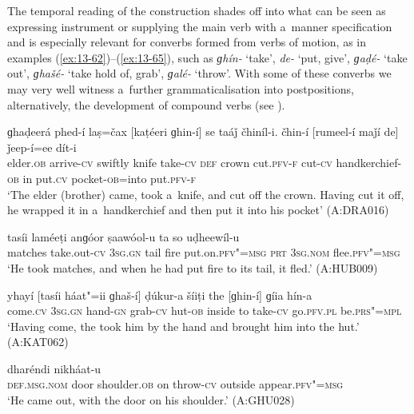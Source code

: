  The temporal  reading of the  construction shades off into what can be seen as expressing instrument or supplying the main verb with a~manner specification and is especially relevant for converbs formed from  verbs of motion, as in examples (\ref{ex:13-62})--(\ref{ex:13-65}), such as \textit{ɡhín-} `take', \textit{de-} `put, give', \textit{ɡaḍé-} `take out', \textit{ɡhašé-} `take hold of, grab', \textit{ɡalé-} `throw'. With some of these converbs we may very well witness a~further grammaticalisation into postpositions, alternatively, the development of compound verbs (see ). 

\begin{exe}
\ex
\label{ex:13-62}
\gll ɡhaḍeerá phed-í laṣ=čax [kaṭéeri ɡhin-í] se taáǰ čhiníl-i. čhin-í [rumeel-í maǰí de] ǰeep-í=ee dít-i \\
elder.\textsc{ob} arrive-\textsc{cv} swiftly knife take-\textsc{cv} \textsc{def} crown cut.\textsc{pfv-f} cut-\textsc{cv} handkerchief-\textsc{ob} in put.\textsc{cv} pocket-\textsc{ob}=into put.\textsc{pfv-f} \\
\glt `The elder (brother) came, took a~knife, and cut off the crown. Having cut it off, he wrapped it in a~handkerchief and then put it into his pocket' (A:DRA016)

\ex
\label{ex:13-63}
 tasíi laméeṭi anɡóor ṣaawóol-u ta so uḍheewíl-u \\
matches take.out-\textsc{cv} \textsc{3sg.gn} tail fire put.on.\textsc{pfv"=msg}  \textsc{prt } \textsc{3sg.nom} flee.\textsc{pfv"=msg} \\
\glt `He took matches, and when he had put fire to its tail, it fled.' (A:HUB009)

\ex
\label{ex:13-64}
\gll yhayí [tasíi háat"=ii ɡhaš-í] ḍúkur-a šíiṭi the [ɡhin-í] ɡíia hín-a  \\
come.\textsc{cv} \textsc{3sg.gn} hand-\textsc{gn} grab-\textsc{cv} hut-\textsc{ob} inside to  take-\textsc{cv} go.\textsc{pfv.pl} be.\textsc{prs"=mpl} \\
\glt `Having come, the took him by the hand and brought him into the hut.' (A:KAT062)

\ex
\label{ex:13-65}
 dharéndi nikháat-u \\
\textsc{def.msg.nom} door shoulder.\textsc{ob} on throw-\textsc{cv} outside appear.\textsc{pfv"=msg} \\
\glt `He came out, with the door on his shoulder.' (A:GHU028) 
\end{exe}

